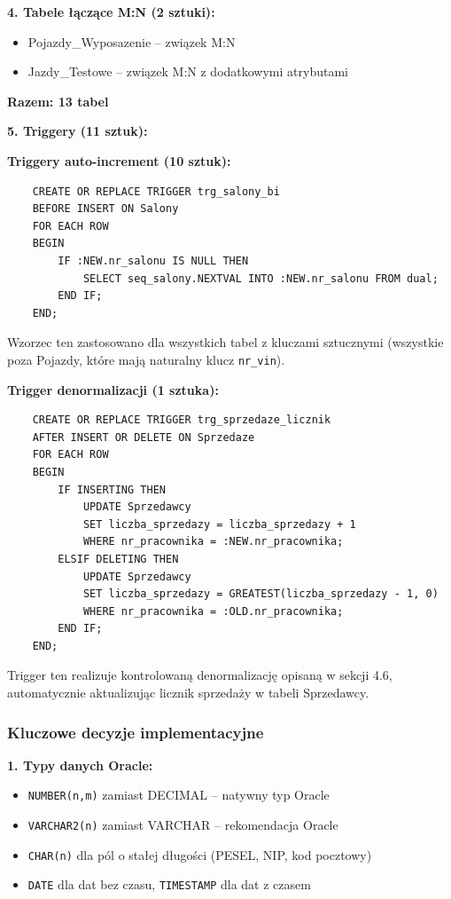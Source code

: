 \documentclass[a4paper,titleauthor]{mwart}
\begin{document}
	\textbf{4. Tabele łączące M:N (2 sztuki):}
	\begin{itemize}
		\item Pojazdy\_Wyposazenie -- związek M:N
		\item Jazdy\_Testowe -- związek M:N z dodatkowymi atrybutami
	\end{itemize}

	\textbf{Razem: 13 tabel}

	\textbf{5. Triggery (11 sztuk):}

	\textbf{Triggery auto-increment (10 sztuk):}
	\begin{verbatim}
	CREATE OR REPLACE TRIGGER trg_salony_bi
	BEFORE INSERT ON Salony
	FOR EACH ROW
	BEGIN
		IF :NEW.nr_salonu IS NULL THEN
			SELECT seq_salony.NEXTVAL INTO :NEW.nr_salonu FROM dual;
		END IF;
	END;
	\end{verbatim}

	Wzorzec ten zastosowano dla wszystkich tabel z kluczami sztucznymi (wszystkie poza Pojazdy, które mają naturalny klucz \texttt{nr\_vin}).

	\textbf{Trigger denormalizacji (1 sztuka):}
	\begin{verbatim}
	CREATE OR REPLACE TRIGGER trg_sprzedaze_licznik
	AFTER INSERT OR DELETE ON Sprzedaze
	FOR EACH ROW
	BEGIN
		IF INSERTING THEN
			UPDATE Sprzedawcy
			SET liczba_sprzedazy = liczba_sprzedazy + 1
			WHERE nr_pracownika = :NEW.nr_pracownika;
		ELSIF DELETING THEN
			UPDATE Sprzedawcy
			SET liczba_sprzedazy = GREATEST(liczba_sprzedazy - 1, 0)
			WHERE nr_pracownika = :OLD.nr_pracownika;
		END IF;
	END;
	\end{verbatim}

	Trigger ten realizuje kontrolowaną denormalizację opisaną w sekcji 4.6, automatycznie aktualizując licznik sprzedaży w tabeli Sprzedawcy.

	\subsubsection{Kluczowe decyzje implementacyjne}

	\textbf{1. Typy danych Oracle:}
	\begin{itemize}
		\item \texttt{NUMBER(n,m)} zamiast DECIMAL -- natywny typ Oracle
		\item \texttt{VARCHAR2(n)} zamiast VARCHAR -- rekomendacja Oracle
		\item \texttt{CHAR(n)} dla pól o stałej długości (PESEL, NIP, kod pocztowy)
		\item \texttt{DATE} dla dat bez czasu, \texttt{TIMESTAMP} dla dat z czasem
	\end{itemize}
\end{document}
